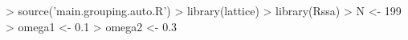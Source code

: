\begin{CodeChunk}
\begin{CodeInput}


> source('main.grouping.auto.R')
> library(lattice)
> library(Rssa)
> N <- 199
> omega1 <- 0.1
> omega2 <- 0.3
\end{CodeInput}

\end{CodeChunk}
